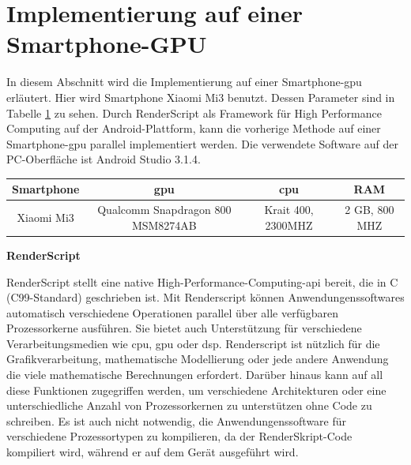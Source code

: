 


\section{Implementierung auf einer Smartphone-GPU}

In diesem Abschnitt wird die Implementierung auf einer Smartphone-\gls{gpu} erläutert. Hier wird Smartphone Xiaomi Mi3 benutzt. Dessen Parameter sind in Tabelle \ref{tbl:Grundlegende Parameter für Mi3} zu sehen. Durch RenderScript als Framework für High Performance Computing auf der Android-Plattform, kann die vorherige Methode auf einer Smartphone-\gls{gpu} parallel implementiert werden. Die verwendete Software auf der PC-Oberfläche ist Android Studio 3.1.4.

\begin{table}[htb]
	\label{tbl:Grundlegende Parameter für Mi3}
	\footnotesize
	\centering
	\begin{tabular}{|c|c|c|c|}
	\toprule
	\textbf{Smartphone} & \textbf{\gls{gpu}} & \textbf{\gls{cpu}} & \textbf{RAM}\\
	\midrule
	Xiaomi Mi3  & Qualcomm Snapdragon 800 MSM8274AB & Krait 400, 2300MHZ & 2 GB, 800 MHZ \\
	\bottomrule
	\end{tabular}
\end{table} 

\textbf{RenderScript}

RenderScript stellt eine native High-Performance-Computing-\gls{api} bereit, die in C (C99-Standard) geschrieben ist. Mit Renderscript können Anwendungenssoftwares automatisch verschiedene Operationen parallel über alle verfügbaren Prozessorkerne ausführen. Sie bietet auch Unterstützung für verschiedene Verarbeitungsmedien wie \gls{cpu}, \gls{gpu} oder \gls{dsp}. Renderscript ist nützlich für die Grafikverarbeitung, mathematische Modellierung oder jede andere Anwendung die viele mathematische Berechnungen erfordert. Darüber hinaus kann auf all diese Funktionen zugegriffen werden, um verschiedene Architekturen oder eine unterschiedliche Anzahl von Prozessorkernen zu unterstützen ohne Code zu schreiben. Es ist auch nicht notwendig, die Anwendungenssoftware für verschiedene Prozessortypen zu kompilieren, da der RenderSkript-Code kompiliert wird, während er auf dem Gerät ausgeführt wird.

